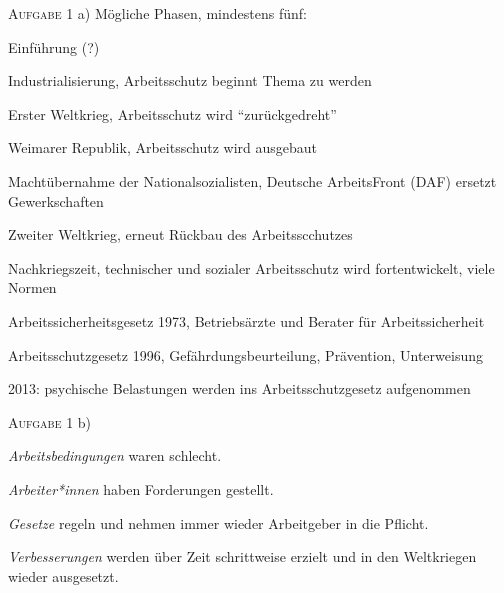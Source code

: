 \textsc{Aufgabe 1} a) \quad Mögliche Phasen, mindestens fünf: 
\begin{myenumerate}
    \item Einführung (?)
    \item Industrialisierung, Arbeitsschutz beginnt Thema zu werden %

    \item Erster Weltkrieg, Arbeitsschutz wird \enquote{zurückgedreht}
    \item Weimarer Republik, Arbeitsschutz wird ausgebaut
    \item Machtübernahme der Nationalsozialisten, Deutsche ArbeitsFront (DAF) ersetzt Gewerkschaften
    \item Zweiter Weltkrieg, erneut Rückbau des Arbeitsscchutzes
    \item Nachkriegszeit, technischer und sozialer Arbeitsschutz wird fortentwickelt, viele Normen
    \item Arbeitssicherheitsgesetz 1973, Betriebsärzte und Berater für Arbeitssicherheit 
    \item Arbeitsschutzgesetz 1996, Gefährdungsbeurteilung, Prävention, Unterweisung
    \item 2013: psychische Belastungen werden ins Arbeitsschutzgesetz aufgenommen
\end{myenumerate}

\textsc{Aufgabe 1} b) \quad
\begin{myitemize}
    \item \emph{Arbeitsbedingungen} waren schlecht.
    \item \emph{Arbeiter*innen} haben Forderungen gestellt.
    \item \emph{Gesetze} regeln und nehmen immer wieder Arbeitgeber in die Pflicht. 
    \item \emph{Verbesserungen} werden über Zeit schrittweise erzielt und in den Weltkriegen wieder ausgesetzt. 
\end{myitemize}


